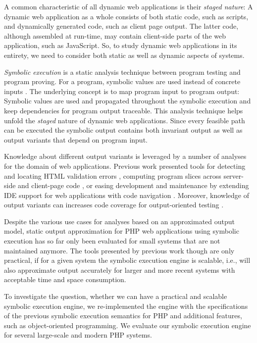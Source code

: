 \documentclass[sigconf]{acmart}
\begin{document}
A common characteristic of all dynamic web applications is their
\emph{staged nature}: A dynamic web application as a whole
consists of both static code, such as scripts, and dynamically generated code,
such as client page output. The latter code, although assembled at
run-time, may contain client-side parts of the web application, such as
JavaScript. So, to study dynamic web applications in its entirety, we need to
consider both static as well as dynamic aspects of systems.

\emph{Symbolic execution} is a static analysis technique between program testing
and program proving. For a program, symbolic values are
used instead of concrete inputs \cite{Darringer1978,King1976}. The underlying
concept is to map program input to program output: Symbolic values are used and
propagated throughout the symbolic execution and keep dependencies for program
output traceable. This analysis technique helps unfold the \emph{staged} nature
of dynamic web applications. Since every feasible path can be executed the
symbolic output contains both invariant output as well as output variants that
depend on program input.

Knowledge about different output variants is leveraged by a number of
analyses for the domain of web applications. Previous work presented tools
for detecting and locating HTML validation errors
\cite{Nguyen:2011:AFH:2190078.2190142}, computing program slices across
server-side and client-page code \cite{Nguyen:2015:CPS:2786805.2786872}, or
easing development and maintenance by extending IDE support for web applications
with code navigation \cite{Nguyen:2015:VIS:2819009.2819140,Nguyen:2014:BCG:2635868.2635928}.
Moreover, knowledge of output variants can increases code coverage for
output-oriented testing \cite{Alshahwan2011}.

Despite the various use cases for analyses based on an approximated output
model, static output approximation for PHP web applications using symbolic
execution has so far only been evaluated for small systems that are not
maintained anymore. The tools presented by previous work
\cite{Nguyen:2015:VIS:2819009.2819140,Nguyen:2014:BCG:2635868.2635928,Nguyen:2015:CPS:2786805.2786872,Nguyen:2011:AFH:2190078.2190142}
though are only practical, if for a given system the symbolic execution engine
is scalable, i.e., will also approximate output accurately for larger and more
recent systems with acceptable time and space consumption.

To investigate the question, whether we can have a practical and scalable
symbolic execution engine, we re-implemented the engine with the specifications
of the previous symbolic execution semantics \cite{Nguyen:2014:BCG:2635868.2635928} for PHP and additional features, such
as object-oriented programming. We evaluate our
symbolic execution engine for several large-scale and modern PHP systems.
\end{document}
